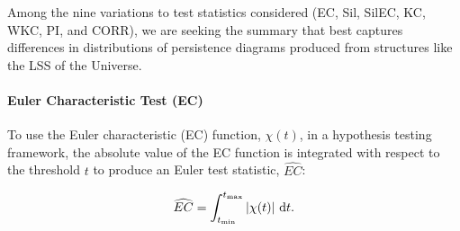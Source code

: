 \documentclass[12pt]{article}
\begin{document}




Among the nine variations to test statistics considered (EC, Sil, SilEC, KC, WKC, PI, and CORR), we are seeking the summary that best captures differences in distributions of persistence diagrams produced from structures like the LSS of the Universe.  

\paragraph{Euler Characteristic Test (EC)}
To use the Euler characteristic (EC) function, $\chi(t)$, in a hypothesis testing framework, the absolute value of the EC function is integrated with respect to the threshold $t$ to produce an Euler test statistic, $\widehat{EC}$:

\begin{equation*}
\widehat{EC} = \int_{t_{\min}}^{t_{\max}} | \chi(t) | \textup{ d}t.
\end{equation*}
\end{document}
